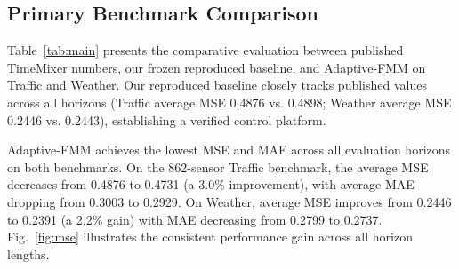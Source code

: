 \documentclass[journal]{IEEEtran}
\begin{document}
\subsection{Primary Benchmark Comparison}
Table~\ref{tab:main} presents the comparative evaluation between published TimeMixer numbers, our frozen reproduced baseline, and Adaptive-FMM on Traffic and Weather. Our reproduced baseline closely tracks published values across all horizons (Traffic average MSE 0.4876 vs. 0.4898; Weather average MSE 0.2446 vs. 0.2443), establishing a verified control platform.

Adaptive-FMM achieves the lowest MSE and MAE across all evaluation horizons on both benchmarks. On the 862-sensor Traffic benchmark, the average MSE decreases from 0.4876 to 0.4731 (a 3.0\% improvement), with average MAE dropping from 0.3003 to 0.2929. On Weather, average MSE improves from 0.2446 to 0.2391 (a 2.2\% gain) with MAE decreasing from 0.2799 to 0.2737. Fig.~\ref{fig:mse} illustrates the consistent performance gain across all horizon lengths.
\end{document}

